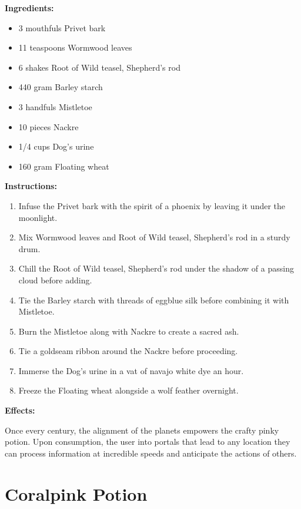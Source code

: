 \documentclass{article}
\begin{document}
\textbf{Ingredients:}

\begin{itemize}
  \item 3 mouthfuls Privet bark
  \item 11 teaspoons Wormwood leaves
  \item 6 shakes Root of Wild teasel, Shepherd's rod
  \item 440 gram Barley starch
  \item 3 handfuls Mistletoe
  \item 10 pieces Nackre
  \item 1/4 cups Dog's urine
  \item 160 gram Floating wheat
\end{itemize}

\textbf{Instructions:}

\begin{enumerate}
  \item Infuse the Privet bark with the spirit of a phoenix by leaving it under the moonlight.
  \item Mix Wormwood leaves and Root of Wild teasel, Shepherd's rod in a sturdy drum.
  \item Chill the Root of Wild teasel, Shepherd's rod under the shadow of a passing cloud before adding.
  \item Tie the Barley starch with threads of eggblue silk before combining it with Mistletoe.
  \item Burn the Mistletoe along with Nackre to create a sacred ash.
  \item Tie a goldseam ribbon around the Nackre before proceeding.
  \item Immerse the Dog's urine in a vat of navajo white dye an hour.
  \item Freeze the Floating wheat alongside a wolf feather overnight.
\end{enumerate}

\textbf{Effects:}

Once every century, the alignment of the planets empowers the crafty pinky potion. Upon consumption, the user into portals that lead to any location they can process information at incredible speeds and anticipate the actions of others.

\newpage
\section*{Coralpink Potion}
\end{document}
